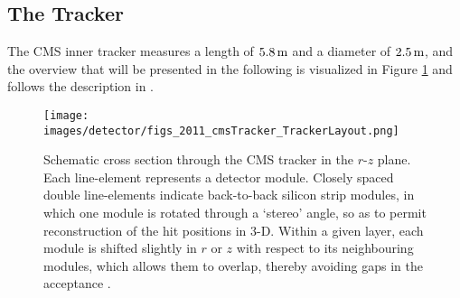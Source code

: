 \subsection{The Tracker}
The CMS inner tracker measures a length of $5.8\,\text{m}$ and a diameter of $2.5\,\text{m}$, and the overview that will be presented in the following is visualized in Figure \ref{fig:tracker} and follows the description in \cite{Chatrchyan:2014fea}. 
\begin{figure}[!htp]
  \centering
   \texttt{[image: images/detector/figs\_2011\_cmsTracker\_TrackerLayout.png]}
   \caption{Schematic cross section through the CMS tracker in the $r$-$z$ plane. Each line-element represents a detector module. Closely spaced double line-elements indicate back-to-back silicon strip modules, in which one module is rotated through a `stereo' angle, so as to permit reconstruction of the hit positions in 3-D. Within a given layer, each module is shifted slightly in $r$ or $z$ with respect to its neighbouring modules, which allows them to overlap, thereby avoiding gaps in the acceptance \cite{Chatrchyan:2014fea}.}
   \label{fig:tracker}
\end{figure}                                                                                            

